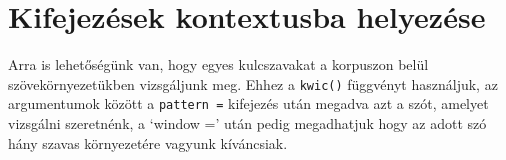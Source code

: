 \documentclass[
]{book}
\newenvironment{Shaded}{\begin{snugshade}}{\end{snugshade}}
\begin{document}
\hypertarget{kifejezuxe9sek-kontextusba-helyezuxe9se}{%
\section{Kifejezések kontextusba
helyezése}\label{kifejezuxe9sek-kontextusba-helyezuxe9se}}

Arra is lehetőségünk van, hogy egyes kulcszavakat a korpuszon belül
szövekörnyezetükben vizsgáljunk meg. Ehhez a \texttt{kwic()} függvényt
használjuk, az argumentumok között a \texttt{pattern\ =} kifejezés után
megadva azt a szót, amelyet vizsgálni szeretnénk, a `window =' után
pedig megadhatjuk hogy az adott szó hány szavas környezetére vagyunk
kíváncsiak.

\begin{Shaded}
\begin{Highlighting}[]


\end{Highlighting}
\end{Shaded}
\end{document}
